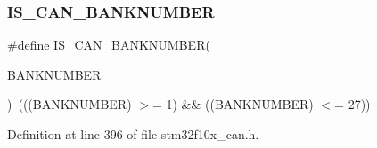 \subsubsection{\texorpdfstring{I\+S\+\_\+\+C\+A\+N\+\_\+\+B\+A\+N\+K\+N\+U\+M\+B\+ER}{IS\_CAN\_BANKNUMBER}}
{\footnotesize\ttfamily \#define I\+S\+\_\+\+C\+A\+N\+\_\+\+B\+A\+N\+K\+N\+U\+M\+B\+ER(\begin{DoxyParamCaption}\item[{}]{B\+A\+N\+K\+N\+U\+M\+B\+ER }\end{DoxyParamCaption})~(((B\+A\+N\+K\+N\+U\+M\+B\+ER) $>$= 1) \&\& ((B\+A\+N\+K\+N\+U\+M\+B\+ER) $<$= 27))}



Definition at line 396 of file stm32f10x\+\_\+can.\+h.

